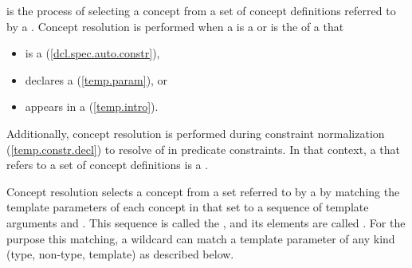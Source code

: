 \pnum
{} is the process of selecting a concept 
from a set of concept definitions referred to by a 
.
% 
Concept resolution is performed when a  
is a  or is the  
of a  that
\begin{itemize}
\item is a  (\ref{dcl.spec.auto.constr}), 
\item declares a  (\ref{temp.param}), or 
\item appears in a  (\ref{temp.intro}).
\end{itemize}
% 
% 
Additionally, concept resolution is performed during constraint normalization 
(\ref{temp.constr.decl}) to resolve  of
 in predicate constraints. 
% 
In that context, a  that refers to a set of concept 
definitions is a .

\pnum
Concept resolution selects a concept from a set referred to by a
 by matching the template parameters of each 
concept in that set to a sequence of template arguments and .
% 
This sequence is called the , and its elements
are called .
% 
For the purpose this matching, a wildcard can match a template 
parameter of any kind (type, non-type, template) as described below.

